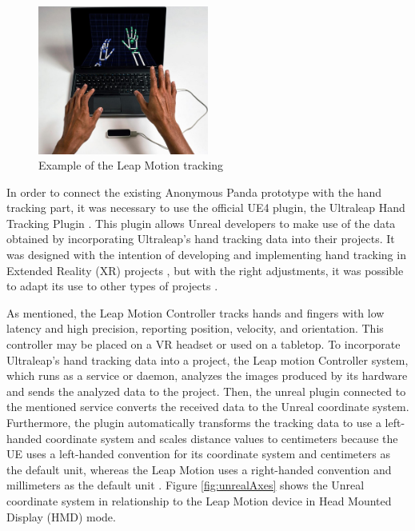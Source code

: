 \begin{figure}[!htb]
\includegraphics[width=0.5\textwidth]{figures/leapMotion.jpg}
\centering
\caption{Example of the Leap Motion tracking \cite{LEAPROD}}
\label{fig:exampleLeap}
\end{figure}

In order to connect the existing Anonymous Panda prototype with the hand tracking part, it was necessary to use the official UE4 plugin, the Ultraleap Hand Tracking Plugin \cite{ULT}. This plugin allows Unreal developers to make use of the data obtained by incorporating Ultraleap's hand tracking data into their projects. It was designed with the intention of developing and implementing hand tracking in Extended Reality (XR) projects \cite{XR}, but with the right adjustments, it was possible to adapt its use to other types of projects \cite{ULTG}.

As mentioned, the Leap Motion Controller tracks hands and fingers with low latency and high precision, reporting position, velocity, and orientation. This controller may be placed on a VR headset or used on a tabletop. To incorporate Ultraleap's hand tracking data into a project, the Leap motion Controller system, which runs as a service or daemon, analyzes the images produced by its hardware and sends the analyzed data to the project. Then, the unreal plugin connected to the mentioned service converts the received data to the Unreal coordinate system. Furthermore, the plugin automatically transforms the tracking data to use a left-handed coordinate system and scales distance values to centimeters because the UE uses a left-handed convention for its coordinate system and centimeters as the default unit, whereas the Leap Motion uses a right-handed convention and millimeters as the default unit \cite{ULTP}. Figure \ref{fig:unrealAxes} shows the Unreal coordinate system in relationship to the Leap Motion device in Head Mounted Display (HMD) mode.

